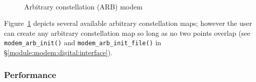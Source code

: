 %
\begin{figure}
\centering
\mbox{
   \quad
   \quad
}
\mbox{
   \quad
   \quad
}
\caption{Arbitrary constellation (ARB) modem}
\label{fig:modem:arb}
\end{figure}
%
Figure~\ref{fig:modem:arb} depicts several available arbitrary
constellation maps;
however the user can create any arbitrary constellation map so long as
no two points overlap
(see {\tt modem\_arb\_init()} and {\tt modem\_arb\_init\_file()} in
\S\ref{module:modem:digital:interface}).

\subsubsection{Performance}
\label{module:modem:digital:performance}

